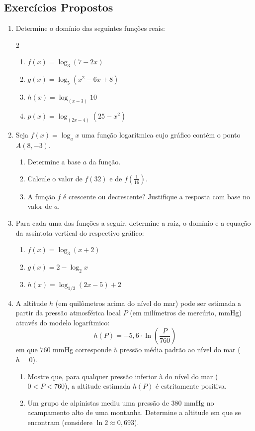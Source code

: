 \documentclass[12pt,a4paper]{report}
\begin{document}
	\subsection*{Exercícios Propostos}
	
	\begin{enumerate}
		\item Determine o domínio das seguintes funções reais:
		\begin{multicols}{2}
			\begin{enumerate}[label=\textbf{\alph*)}]
				\item $f(x) = \log_3 (7 - 2x)$
				\item $g(x) = \log_5 (x^2 - 6x + 8)$
				\item $h(x) = \log_{(x - 3)} 10$
				\item $p(x) = \log_{(2x - 4)} (25 - x^2)$
			\end{enumerate}
		\end{multicols}
		
		\item Seja $f(x) = \log_a x$ uma função logarítmica cujo gráfico contém o ponto $A(8, -3)$.
		\begin{enumerate}[label=\textbf{\alph*)}]
			\item Determine a base $a$ da função.
			\item Calcule o valor de $f(32)$ e de $f\left(\frac{1}{16}\right)$.
			\item A função $f$ é crescente ou decrescente? Justifique a resposta com base no valor de $a$.
		\end{enumerate}
		
		\item Para cada uma das funções a seguir, determine a raiz, o domínio e a equação da assíntota vertical do respectivo gráfico:
		\begin{enumerate}[label=\textbf{\alph*)}]
			\item $f(x) = \log_3 (x + 2)$
			\item $g(x) = 2 - \log_2 x$
			\item $h(x) = \log_{1/3} (2x - 5) + 2$
		\end{enumerate}
		
		\item A altitude $h$ (em quilômetros acima do nível do mar) pode ser estimada a partir da pressão atmosférica local $P$ (em milímetros de mercúrio, $\text{mmHg}$) através do modelo logarítmico:
		$$h(P) = -5{,}6 \cdot \ln\left(\frac{P}{760}\right)$$
		em que $760\text{ mmHg}$ corresponde à pressão média padrão ao nível do mar ($h = 0$).
		\begin{enumerate}[label=\textbf{\alph*)}]
			\item Mostre que, para qualquer pressão inferior à do nível do mar ($0 < P < 760$), a altitude estimada $h(P)$ é estritamente positiva.
			\item Um grupo de alpinistas mediu uma pressão de $380\text{ mmHg}$ no acampamento alto de uma montanha. Determine a altitude em que se encontram (considere $\ln 2 \approx 0{,}693$).
		\end{enumerate}
	\end{enumerate}
	
\end{document}
